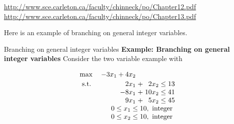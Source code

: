 \url{http://www.sce.carleton.ca/faculty/chinneck/po/Chapter12.pdf}
%
\url{http://www.sce.carleton.ca/faculty/chinneck/po/Chapter13.pdf}
%
%

Here is an example of branching on general integer variables.

\begin{example}{Branching on general integer variables}{}
\textbf{Example: Branching on general integer variables}
Consider the two variable example with
 
 \[
 \begin{array}{l r@{\;}c@{\;}r@{\;}c@{\;}r}
 \max & -3x_1 + 4x_2 & & & & \\[2pt]
 \st  & 2x_1  & + & 2 x_2 & \leq & 13 \\
      & -8 x_1 & + & 10x_2 & \leq & 41 \\
      & 9x_1  & + & 5x_2  & \leq & 45 \\
      & \multicolumn{5}{r}{0 \leq x_1 \leq 10, \text{ integer }} \\
      & \multicolumn{5}{r}{0 \leq x_2 \leq 10, \text{ integer }}
 \end{array}
 \]
 
 
 

\tikzset{
  S/.style = {draw, rectangle, rounded corners=0.1cm, minimum size = 8mm,  top color=blue!10, bottom color=blue!10},%
}



\end{example}

